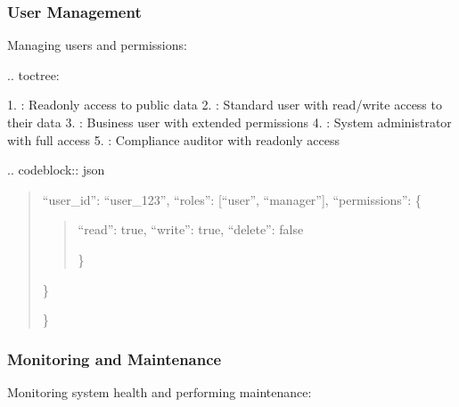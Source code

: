 \documentclass[letterpaper,10pt,english]{sphinxmanual}
\begin{document}
\subsubsection{User Management}
\label{\detokenize{user-guide/index:user-management}}
\sphinxAtStartPar
Managing users and permissions:

\sphinxAtStartPar
{}
.. toctree:

\begin{sphinxVerbatim}[commandchars=\\\{\}]
 
  

\end{sphinxVerbatim}

\sphinxAtStartPar
{}
1. : Read\sphinxhyphen{}only access to public data
2. : Standard user with read/write access to their data
3. : Business user with extended permissions
4. : System administrator with full access
5. : Compliance auditor with read\sphinxhyphen{}only access

\sphinxAtStartPar
{}
.. code\sphinxhyphen{}block:: json
\begin{quote}
\begin{description}
\sphinxlineitem{\{}
\sphinxAtStartPar
“user\_id”: “user\_123”,
“roles”: {[}“user”, “manager”{]},
“permissions”: \{
\begin{quote}
\begin{description}
\sphinxAtStartPar
“read”: true,
“write”: true,
“delete”: false

\end{description}

\sphinxAtStartPar
\}
\end{quote}

\sphinxAtStartPar
\}

\end{description}

\sphinxAtStartPar
\}
\end{quote}


\subsubsection{Monitoring and Maintenance}
\label{\detokenize{user-guide/index:monitoring-and-maintenance}}
\sphinxAtStartPar
Monitoring system health and performing maintenance:
\end{document}
